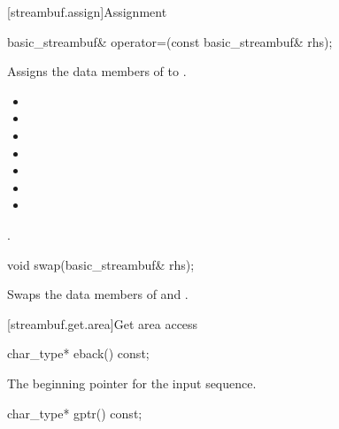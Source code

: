 [streambuf.assign]{Assignment}

%
%
\begin{itemdecl}
basic_streambuf& operator=(const basic_streambuf& rhs);
\end{itemdecl}

\begin{itemdescr}
\pnum
\effects Assigns the data members of 
to .

\pnum
\postconditions

\begin{itemize}
\item {}
\item {}
\item {}
\item {}
\item {}
\item {}
\item {}
\end{itemize}

\pnum
\returns {}.
\end{itemdescr}

%
%
\begin{itemdecl}
void swap(basic_streambuf& rhs);
\end{itemdecl}

\begin{itemdescr}
\pnum
\effects Swaps the data members of 
and .
\end{itemdescr}

[streambuf.get.area]{Get area access}

%
\begin{itemdecl}
char_type* eback() const;
\end{itemdecl}

\begin{itemdescr}
\pnum
\returns
The beginning pointer for the input sequence.
\end{itemdescr}

%
\begin{itemdecl}
char_type* gptr() const;
\end{itemdecl}

